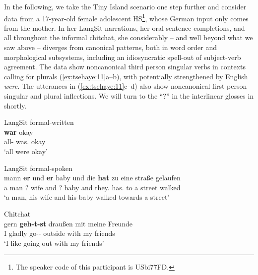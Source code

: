 \documentclass[output=paper]{langscibook}
\begin{document}
In the following, we take the Tiny Island scenario one step further and consider data from a 17-year-old female adolescent HS\footnote{The speaker code of this participant is USbi77FD.}, whose German input only comes from the mother. In her LangSit narrations, her oral sentence completions, and all throughout the informal chitchat, she considerably – and well beyond what we saw above – diverges from canonical patterns, both in word order and morphological subsystems, including an idiosyncratic spell-out of subject-verb agreement. The data show noncanonical third person singular verbs in contexts calling for plurals (\ref{ex:tsehaye:11}a--b), with  potentially strengthened by English \textit{were}. The utterances in (\ref{ex:tsehaye:11}c--d) also show noncanonical first person singular and plural inflections. We will turn to the “?” in the interlinear glosses in  shortly.

\ea%
    \label{ex:tsehaye:11}
\ea LangSit formal-written\label{ex:tsehaye:11a}\\
 \textbf{war}  {okay}\\
	 all-\Pl{} was.\Sg{} okay\\
\glt ‘all were okay’

\ex LangSit formal-spoken\label{ex:tsehaye:11b}\\
 {mann} \textbf{{er}} {und} \textbf{{er}} {baby} {und} {die} \textbf{{hat}} {zu} {eine} {straße} {gelaufen}\\
	  a man       ? wife and ? baby and they.\Pl{} has.\Sg{} to a street walked\\
\glt ‘a man, his wife and his baby walked towards a street’

\ex Chitchat\label{ex:tsehaye:11c}\\
 {gern} \textbf{{geh-t-st}} {draußen} {mit} {meine} {Freunde}\\
I gladly go-\Tsg-\Ssg{} outside with my friends\\
\glt ‘I like going out with my friends’
\end{document}
